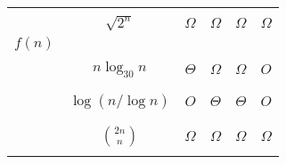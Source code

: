 \documentclass[12pt,twoside]{article}
\begin{document}
\begin{problem}{20}
\begin{center}
\begin{tabular}{|c|c||c|c|c|c|}
\cline{2-6}
&                    & \hspace*{1in} & \hspace*{1in} & \hspace*{1in} &\\
& $\sqrt{2^n}$         &      $\Omega$         &       $\Omega$         &    $\Omega$     &  $\Omega$         \\
$f(n)$
&                    &                 &                 &             &  \\
\cline{2-6}
&                    & \hspace*{1in} & \hspace*{1in} & \hspace*{1in} &\\
& $n\log_{30}{n}$    &     $\Theta$            &     $\Omega$              &    $\Omega$     &   $O$     \\
&                    &                 &                 &             &  \\
\cline{2-6}
&                    & \hspace*{1in} & \hspace*{1in} & \hspace*{1in} &\\
& $\log(n/\log n)$  &      $O$           &    $\Theta$             &  $\Theta$   &  $O$        \\
&                    &                 &                 &              &  \\
\cline{2-6}
&                    & \hspace*{1in} & \hspace*{1in} & \hspace*{1in} &\\
& $\binom{2n}{n}$  &      $\Omega$             &         $\Omega$          &    $\Omega$   &    $\Omega$    \\
&                    &                 &                 &              & \\
\hline
\end{tabular}
\end{center}


\end{problem}
\end{document}
